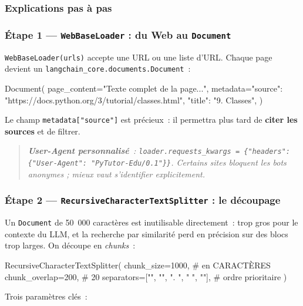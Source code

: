 \documentclass[11pt,a4paper]{article}
\begin{document}
\subsubsection{Explications pas à pas}

\subsubsection*{Étape 1 — \texttt{WebBaseLoader} : du Web au \texttt{Document}}

\texttt{WebBaseLoader(urls)} accepte une URL ou une liste d'URL. Chaque
page devient un \texttt{langchain\_core.documents.Document}~:

\begin{pythoncode}
Document(
    page_content="Texte complet de la page...",
    metadata={"source": "https://docs.python.org/3/tutorial/classes.html",
              "title": "9. Classes"},
)
\end{pythoncode}

Le champ \texttt{metadata["source"]} est précieux~: il permettra plus tard
de \textbf{citer les sources} et de filtrer.

\begin{quote}\itshape
\textbf{User-Agent personnalisé}~:
\texttt{loader.requests\_kwargs = \{"headers": \{"User-Agent": "PyTutor-Edu/0.1"\}\}}.
Certains sites bloquent les bots anonymes ; mieux vaut s'identifier
explicitement.
\end{quote}

\subsubsection*{Étape 2 — \texttt{RecursiveCharacterTextSplitter} : le découpage}

Un \texttt{Document} de 50~000 caractères est inutilisable directement~:
trop gros pour le contexte du LLM, et la recherche par similarité perd
en précision sur des blocs trop larges. On découpe en \emph{chunks}~:

\begin{pythoncode}
RecursiveCharacterTextSplitter(
    chunk_size=1000,                                # en CARACTÈRES
    chunk_overlap=200,                              # 20%
    separators=["\n\n", "\n", ". ", " ", ""],       # ordre prioritaire
)
\end{pythoncode}

Trois paramètres clés~:
\end{document}
